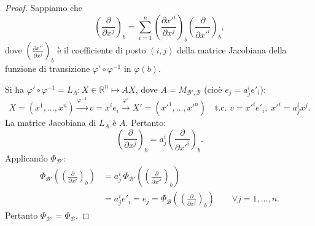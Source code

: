 \begin{proof}
        Sappiamo che
        \[
        \left( \frac{\partial}{\partial x^j} \right)_b = \sum_{i=1}^n \left( \frac{\partial x'^i}{\partial x^j} \right)_b \left( \frac{\partial}{\partial x'^i} \right)_b,
        \]
        dove $\left( \frac{\partial x'^i}{\partial x^j} \right)_b$ è il coefficiente di posto $(i, j)$ della matrice Jacobiana della funzione di transizione $\varphi' \circ \varphi^{-1}$ in $\varphi(b)$.

        Si ha $\varphi' \circ \varphi^{-1} = L_A : X \in \mathbb{R}^n \longmapsto AX$, dove $A = M_{\mathcal{B}', \mathcal{B}}$ (cioè $e_j = a^i_j e'_i$):
        \[
        X = (x^1, \dots, x^n) \xrightarrow{\varphi^{-1}} v = x^i e_i \xrightarrow{\varphi'} X' = (x'^1, \dots, x'^n) \quad \text{t.c. } v = x'^i e'_i, \; x'^i = a^i_j x^j.
        \]
        La matrice Jacobiana di $L_A$ è $A$. Pertanto:
        \[
        \left( \frac{\partial}{\partial x^j} \right)_b = a^i_j \left( \frac{\partial}{\partial x'^i} \right)_b.
        \]
        Applicando $\Phi_{\mathcal{B}'}$:
        \begin{align*}
        \Phi_{\mathcal{B}'} \left( \left( \frac{\partial}{\partial x^j} \right)_b \right) &= a^i_j \, \Phi_{\mathcal{B}'} \left( \left( \frac{\partial}{\partial x'^i} \right)_b \right) \\
        &= a^i_j e'_i = e_j = \Phi_{\mathcal{B}} \left( \left( \frac{\partial}{\partial x^j} \right)_b \right) \qquad \forall j = 1, \dots, n.
        \end{align*}
        Pertanto $\Phi_{\mathcal{B}'} = \Phi_{\mathcal{B}}$.
        \end{proof}